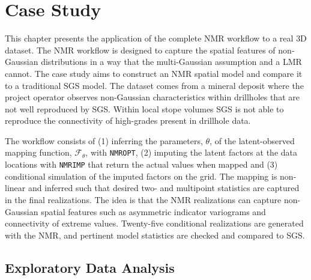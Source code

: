 
\chapter{Case Study}
\label{ch:casestudy}

This chapter presents the application of the complete \gls{NMR} workflow to a real \gls{3D} dataset. The \gls{NMR} workflow is designed to capture the spatial features of non‐Gaussian distributions in a way that the multi-Gaussian assumption and a \gls{LMR} cannot. The case study aims to construct an \gls{NMR} spatial model and compare it to a traditional \gls{SGS} model. The dataset comes from a mineral deposit where the project operator observes non-Gaussian characteristics within drillholes that are not well reproduced by \gls{SGS}. Within local stope volumes \gls{SGS} is not able to reproduce the connectivity of high-grades present in drillhole data.

The workflow consists of (1) inferring the parameters, $\theta$, of the latent-observed mapping function, $\mathcal{F}_{\theta}$, with \texttt{NMROPT}, (2) imputing the latent factors at the data locations with \texttt{NMRIMP} that return the actual values when mapped and (3) conditional simulation of the imputed factors on the grid. The mapping is non-linear and inferred such that desired two- and multipoint statistics are captured in the final realizations. The idea is that the \gls{NMR} realizations can capture non-Gaussian spatial features such as asymmetric indicator variograms and connectivity of extreme values. Twenty-five conditional realizations are generated with the \gls{NMR}, and pertinent model statistics are checked and compared to \gls{SGS}.

\FloatBarrier
\section{Exploratory Data Analysis}
\label{sec:eda}

